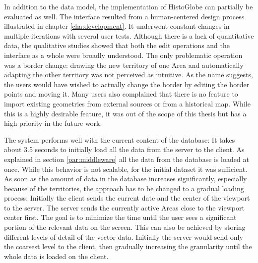 In addition to the data model, the implementation of HistoGlobe can partially be evaluated as well. The interface resulted from a human-centered design process illustrated in chapter \ref{cha:development}. It underwent constant changes in multiple iterations with several user tests. Although there is a lack of quantitative data, the qualitative studies showed that both the edit operations and the interface as a whole were broadly understood. The only problematic operation was a border change: drawing the new territory of one Area and automatically adapting the other territory was not perceived as intuitive. As the name suggests, the users would have wished to actually change the border by editing the border points and moving it. Many users also complained that there is no feature to import existing geometries from external sources or from a historical map. While this is a highly desirable feature, it was out of the scope of this thesis but has a high priority in the future work.

The system performs well with the current content of the database: It takes about 3.5 seconds to initially load all the data from the server to the client. As explained in section \ref{par:middleware}  all the data from the database is loaded at once. While this behavior is not scalable, for the initial dataset it was sufficient. As soon as the amount of data in the database increases significantly, especially because of the territories, the approach has to be changed to a gradual loading process: Initially the client sends the current date and the center of the viewport to the server. The server sends the currently active Areas close to the viewport center first. The goal is to minimize the time until the user sees a significant portion of the relevant data on the screen. This can also be achieved by storing different levels of detail of the vector data. Initially the server would send only the coarsest level to the client, then gradually increasing the granularity until the whole data is loaded on the client.

